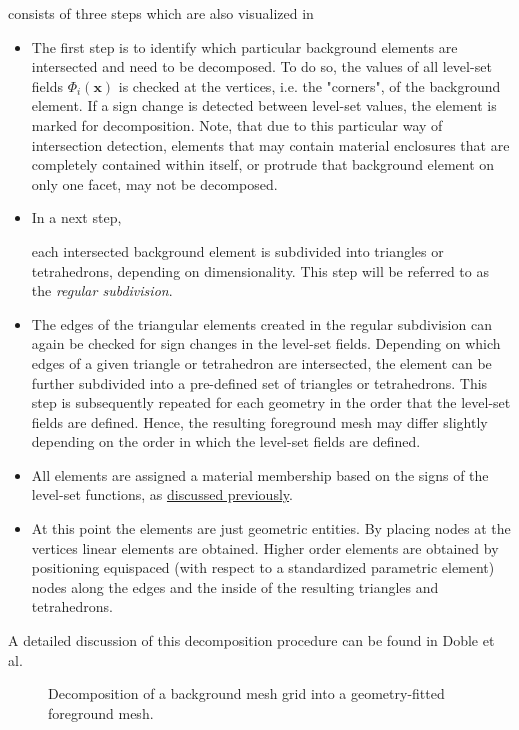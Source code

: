  consists of three steps which are also visualized in 
\begin{itemize}
    \item The first step is to identify which particular background elements are intersected and need to be decomposed. To do so, the values of all level-set fields $\Phi_i(\bm{x})$ is checked at the vertices, i.e. the "corners", of the background element. If a sign change is detected between level-set values, the element is marked for decomposition. Note, that due to this particular way of intersection detection, elements that may contain material enclosures that are completely contained within itself, or protrude that background element on only one facet, may not be decomposed.

    \item \hypertarget{regular_subdivision}{In a next step,} each intersected background element is subdivided into triangles or tetrahedrons, depending on dimensionality. This step will be referred to as the \emph{regular subdivision}.

    \item The edges of the triangular elements created in the regular subdivision can again be checked for sign changes in the level-set fields. Depending on which edges of a given triangle or tetrahedron are intersected, the element can be further subdivided into a pre-defined set of triangles or tetrahedrons.
    This step is subsequently repeated for each geometry in the order that the level-set fields are defined. Hence, the resulting foreground mesh may differ slightly depending on the order in which the level-set fields are defined.

    \item All elements are assigned a material membership based on the signs of the level-set functions, as \hyperlink{phase_assignment}{discussed previously}.
    
    \item At this point the elements are just geometric entities. By placing nodes at the vertices linear elements are obtained. Higher order elements are obtained by positioning equispaced (with respect to a standardized parametric element) nodes along the edges and the inside of the resulting triangles and tetrahedrons.
\end{itemize}
A detailed discussion of this decomposition procedure can be found in Doble et al. \cite{Doble2023} 

\begin{figure}[h]
    \vspace{0.2cm}
    \begin{center}
    
    \caption{Decomposition of a background mesh grid into a geometry-fitted foreground mesh.} 
    \label{fig:decomposition}
    \end{center}
\end{figure}

